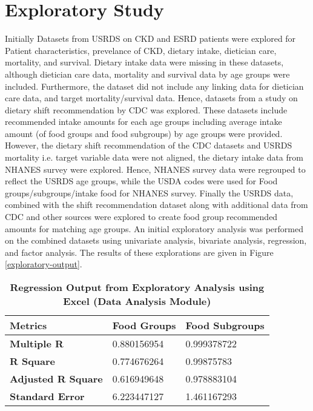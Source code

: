 \section{Exploratory Study}
Initially Datasets from USRDS on CKD and ESRD patients were explored for Patient characteristics, prevelance of CKD, dietary intake, dietician care, mortality, and survival. Dietary intake data were missing in these datasets, although dietician care data, mortality and survival data by age groups were included. Furthermore, the dataset did not include any linking data for dietician care data, and target mortality/survival data. Hence, datasets from a study on dietary shift recommendation by CDC was explored. These datasets include recommended intake amounts for each age groups including average intake amount (of food groups and food subgroups) by age groups were provided. However, the dietary shift recommendation of the CDC datasets and USRDS mortality i.e. target variable data were not aligned, the dietary intake data from NHANES survey were explored. Hence, NHANES survey data were regrouped to reflect the USRDS age groups, while the USDA codes were used for Food groups/subgroups/intake food for NHANES survey. Finally the USRDS data, combined with the shift recommendation dataset along with additional data from CDC and other sources were explored to create food group recommended amounts for matching age groups. An initial exploratory analysis was performed on the combined datasets using univariate analysis, bivariate analysis, regression, and factor analysis. The results of these explorations are given in Figure  \ref{exploratory-output}.

\begin{table}[!htb]
\caption{\textbf{Regression Output from Exploratory Analysis using Excel (Data Analysis Module)}}
\begin{tabular}{  | p{5 cm} | p{5 cm}  | p{5 cm} | }
\hline
   \textbf{Metrics} & \textbf{Food Groups} & \textbf{Food Subgroups} \\
\hline   
   \textbf{Multiple R}	& 0.880156954 & 0.999378722\\
\hline
\textbf{R Square}	& 0.774676264 & 0.99875783\\
\hline
\textbf{Adjusted R Square} &	0.616949648 &  0.978883104\\ 
\hline
\textbf{Standard Error}	& 6.223447127 & 1.461167293\\
\hline
\end{tabular}
\end{table}

